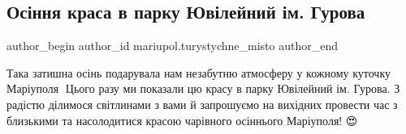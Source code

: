  
 
 
 
 

\subsection{Осіння краса в парку Ювілейний ім. Гурова}
\label{sec:22_10_2021.fb.mariupol.turystychne_misto.1.osinnja_krasa_v_parku_juvilejnyj_im_gurova}

\ifcmt
 author_begin
   author_id mariupol.turystychne_misto
 author_end
\fi

Така затишна осінь подарувала нам незабутню атмосферу у кожному куточку
Маріуполя🍂 Цього разу ми показали цю красу в парку Ювілейний ім. Гурова. З
радістю ділимося світлинами з вами й запрошуємо на вихідних провести час з
близькими та насолодитися красою чарівного осіннього Маріуполя! 😍
